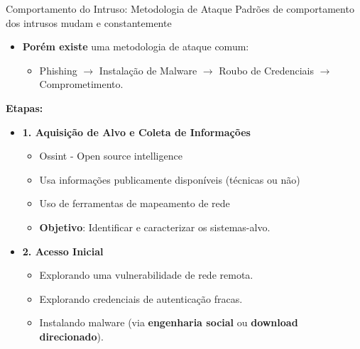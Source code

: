 \begin{frame}{Comportamento do Intruso: Metodologia de Ataque}
    Padrões de comportamento dos intrusos mudam e constantemente

    \begin{itemize}
        \item \textbf{Porém existe} uma metodologia de ataque comum:
              \begin{itemize}
                  \item Phishing $\rightarrow$ Instalação de Malware $\rightarrow$ Roubo de Credenciais $\rightarrow$ Comprometimento.
              \end{itemize}
    \end{itemize}
    \textbf{Etapas:}

    \begin{itemize}


        \item \textbf{1. Aquisição de Alvo e Coleta de Informações}
              \begin{itemize}
                  \item Ossint - Open source intelligence
                  \item Usa informações publicamente disponíveis (técnicas ou não)
                  \item Uso de ferramentas de mapeamento de rede
                  \item \textbf{Objetivo}: Identificar e caracterizar os sistemas-alvo.
              \end{itemize}

        \item \textbf{2. Acesso Inicial}
              \begin{itemize}
                  \item Explorando uma vulnerabilidade de rede remota.
                  \item Explorando credenciais de autenticação fracas.
                  \item Instalando malware (via \textbf{engenharia social} ou \textbf{download direcionado}).
              \end{itemize}
    \end{itemize}
\end{frame}

